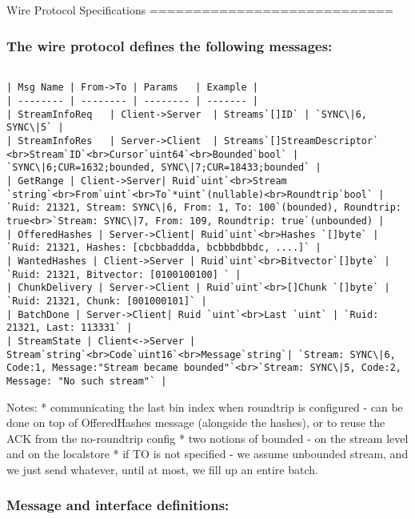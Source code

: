 Wire Protocol Specifications
============================

\subsubsection{The wire protocol defines the following messages:}

\begin{lstlisting}

| Msg Name | From->To | Params   | Example |
| -------- | -------- | -------- | ------- |
| StreamInfoReq   | Client->Server  | Streams`[]ID` | `SYNC\|6, SYNC\|5` |
| StreamInfoRes   | Server->Client  | Streams`[]StreamDescriptor` <br>Stream`ID`<br>Cursor`uint64`<br>Bounded`bool` | `SYNC\|6;CUR=1632;bounded, SYNC\|7;CUR=18433;bounded` |
| GetRange | Client->Server| Ruid`uint`<br>Stream `string`<br>From`uint`<br>To`*uint`(nullable)<br>Roundtrip`bool` | `Ruid: 21321, Stream: SYNC\|6, From: 1, To: 100`(bounded), Roundtrip: true<br>`Stream: SYNC\|7, From: 109, Roundtrip: true`(unbounded) | 
| OfferedHashes | Server->Client| Ruid`uint`<br>Hashes `[]byte` | `Ruid: 21321, Hashes: [cbcbbaddda, bcbbbdbbdc, ....]` |
| WantedHashes | Client->Server | Ruid`uint`<br>Bitvector`[]byte` | `Ruid: 21321, Bitvector: [0100100100] ` |
| ChunkDelivery | Server->Client | Ruid`uint`<br>[]Chunk `[]byte` | `Ruid: 21321, Chunk: [001000101]` |
| BatchDone | Server->Client| Ruid `uint`<br>Last `uint` | `Ruid: 21321, Last: 113331` |
| StreamState | Client<->Server | Stream`string`<br>Code`uint16`<br>Message`string`| `Stream: SYNC\|6, Code:1, Message:"Stream became bounded"`<br>`Stream: SYNC\|5, Code:2, Message: "No such stream"` |

\end{lstlisting}

Notes:
* communicating the last bin index when roundtrip is configured - can be done on top of OfferedHashes message (alongside the hashes), or to reuse the ACK from the no-roundtrip config
* two notions of bounded - on the stream level and on the localstore
* if TO is not specified - we assume unbounded stream, and we just send whatever, until at most, we fill up an entire batch.

\subsubsection{Message and interface definitions:}

